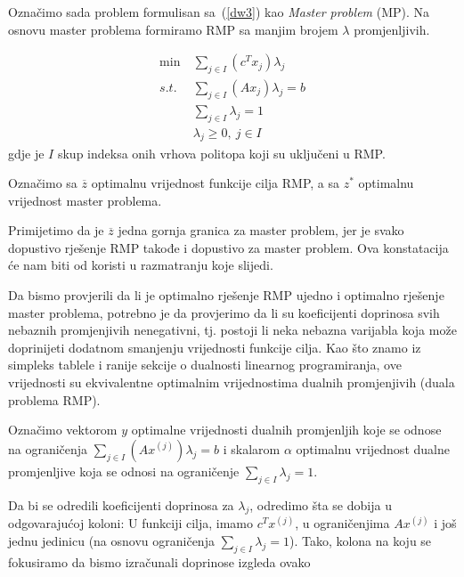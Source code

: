 \documentclass[a4paper, utf8, 11pt, colorlinks]{book}
\theoremstyle{definition}
\begin{document}
 Označimo sada problem formulisan  sa~(\ref{dw3}) kao \emph{Master problem} (MP). Na osnovu master problema formiramo RMP sa manjim brojem $\lambda$ promjenljivih.
 
     \begin{equation}
 	\begin{aligned}\label{dw4}
 		\min\  & \sum_{j\in I}(c^T x_j)\lambda_j\\
 		s.t.\  &\sum_{j\in I} (A x_j)\lambda_j=b\\
 		&\sum_{j\in I}\lambda_j = 1\\
 		&\lambda_j\geqslant 0,\ j  \in I
 	\end{aligned}
 \end{equation}
gdje je $I$ skup indeksa onih vrhova politopa koji su uključeni u RMP.

Označimo sa $\overline{z}$ optimalnu vrijednost funkcije cilja RMP, a sa $z^*$ optimalnu vrijednost master problema.

Primijetimo da je $\overline{z}$ jedna gornja granica za master problem, jer je svako dopustivo rješenje RMP takođe i dopustivo za master problem. Ova konstatacija će nam biti od koristi u razmatranju koje slijedi.

Da bismo provjerili da li je optimalno rješenje RMP ujedno i optimalno rješenje master problema, potrebno je da provjerimo da li su koeficijenti doprinosa svih nebaznih promjenjivih nenegativni, tj. postoji li neka nebazna varijabla koja može doprinijeti dodatnom smanjenju vrijednosti funkcije cilja. Kao što znamo iz simpleks tablele i ranije sekcije o dualnosti linearnog programiranja, ove vrijednosti su ekvivalentne optimalnim vrijednostima dualnih promjenjivih (duala problema RMP).   



Označimo vektorom $y$ optimalne vrijednosti dualnih promjenljih koje se odnose na ograničenja $\sum_{j\in I} (A x^{(j)})\lambda_j=b$ i skalarom $\alpha$ optimalnu vrijednost dualne promjenljive koja se odnosi na ograničenje $\sum_{j\in I}\lambda_j = 1$. 

Da bi se odredili   koeficijenti doprinosa za $\lambda_j$, odredimo šta se dobija u odgovarajućoj koloni: U funkciji cilja, imamo $c^Tx^{(j)}$, u ograničenjima $A x^{(j)} $ i još jednu jedinicu (na osnovu ograničenja $\sum_{j\in I}\lambda_j = 1$). Tako, kolona na koju se fokusiramo da bismo izračunali doprinose izgleda ovako
\end{document}
